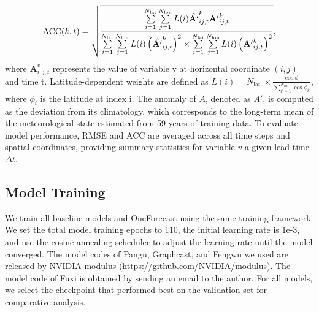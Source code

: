     \begin{equation}\small
    \operatorname{ACC}(k, t) = \sqrt{\frac{\sum\limits_{i=1}^{N_{\text{lat}}} \sum\limits_{j=1}^{N_{\text{lon}}} L(i) \hat{\mathbf{A'}}_{ij,t}^k \mathbf{A'}_{ij,t}^k}{\sum\limits_{i=1}^{N_{\text{lat}}} \sum\limits_{j=1}^{N_{\text{lon}}} L(i) \left( \hat{\mathbf{A'}}_{ij,t}^k \right)^2 \times \sum\limits_{i=1}^{N_{\text{lat}}} \sum\limits_{j=1}^{N_{\text{lon}}} L(i) \left( \mathbf{A'}_{ij,t}^k \right)^2}},
\end{equation}
    where $\mathbf{A}_{i, j, t}^v$ represents the value of variable v at horizontal coordinate $(i, j)$ and time t. Latitude-dependent weights are defined as $L(i)=N_{\text {lat }} \times \frac{\cos \phi_i}{\sum_{i’=1}^{N_{\text {lat}}} \cos \phi_{i’}}$, where $\phi_i$ is the latitude at index i. The anomaly of $A$, denoted as $A'$, is computed as the deviation from its climatology, which corresponds to the long-term mean of the meteorological state estimated from 59 years of training data. To evaluate model performance, RMSE and ACC are averaged across all time steps and spatial coordinates, providing summary statistics for variable $v$ a given lead time $\Delta t$.

\subsection{Model Training}
%
We train all baseline models and OneForecast using the same training framework. We set the total model training epochs to 110, the initial learning rate is 1e-3, and use the cosine annealing scheduler to adjust the learning rate until the model converged. The model codes of Pangu, Graphcast, and Fengwu we used are released by NVIDIA modulus (\url{https://github.com/NVIDIA/modulus}). The model code of Fuxi is obtained by sending an email to the author. For all models, we select the checkpoint that performed best on the validation set for comparative analysis.
